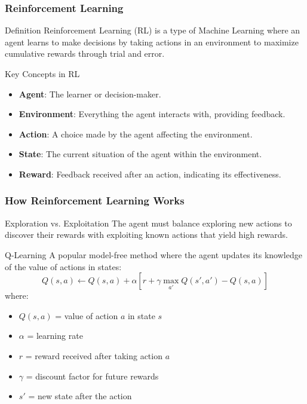 \documentclass[aspectratio=169]{beamer}
\begin{document}
\begin{frame}[fragile]
    \frametitle{Reinforcement Learning}
    \begin{block}{Definition}
        Reinforcement Learning (RL) is a type of Machine Learning where an agent learns to make decisions by taking actions in an environment to maximize cumulative rewards through trial and error.
    \end{block}
    \begin{block}{Key Concepts in RL}
        \begin{itemize}
            \item \textbf{Agent}: The learner or decision-maker.
            \item \textbf{Environment}: Everything the agent interacts with, providing feedback.
            \item \textbf{Action}: A choice made by the agent affecting the environment.
            \item \textbf{State}: The current situation of the agent within the environment.
            \item \textbf{Reward}: Feedback received after an action, indicating its effectiveness.
        \end{itemize}
    \end{block}
\end{frame}

\begin{frame}[fragile]
    \frametitle{How Reinforcement Learning Works}
    \begin{block}{Exploration vs. Exploitation}
        The agent must balance exploring new actions to discover their rewards with exploiting known actions that yield high rewards.
    \end{block}
    \begin{block}{Q-Learning}
        A popular model-free method where the agent updates its knowledge of the value of actions in states:
        \begin{equation}
            Q(s, a) \leftarrow Q(s, a) + \alpha \left[r + \gamma \max_{a'} Q(s', a') - Q(s, a)\right]
        \end{equation}
        where:
        \begin{itemize}
            \item $Q(s, a)$ = value of action $a$ in state $s$
            \item $\alpha$ = learning rate
            \item $r$ = reward received after taking action $a$
            \item $\gamma$ = discount factor for future rewards
            \item $s'$ = new state after the action
        \end{itemize}
    \end{block}
\end{frame}
\end{document}
